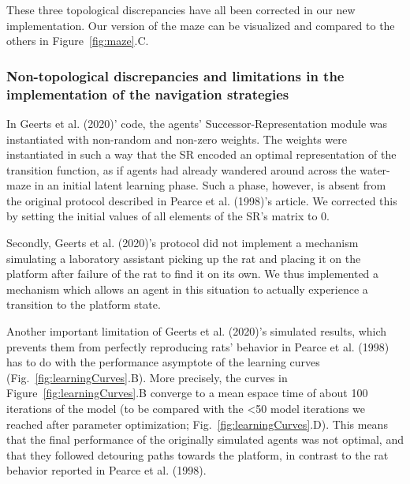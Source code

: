 These three topological discrepancies have all been corrected in our new implementation. Our version of the maze can be visualized and compared to the others in Figure~\ref{fig:maze}.C.

\subsubsection{Non-topological discrepancies and limitations in the implementation of the navigation strategies}

In Geerts et al. (2020)’ code, the agents’ Successor-Representation module was instantiated with non-random and non-zero weights. The weights were instantiated in such a way that the SR encoded an optimal representation of the transition function, as if agents had already wandered around across the water-maze in an initial latent learning phase. Such a phase, however, is absent from the original protocol described in Pearce et al. (1998)'s article. We corrected this by setting the initial values of all elements of the SR's matrix to 0.

Secondly, Geerts et al. (2020)’s protocol did not implement a mechanism simulating a laboratory assistant picking up the rat and placing it on the platform after failure of the rat to find it on its own. We thus implemented a mechanism which allows an agent in this situation to actually experience a transition to the platform state.

Another important limitation of Geerts et al. (2020)'s simulated results, which prevents them from perfectly reproducing rats' behavior in Pearce et al. (1998) has to do with the performance asymptote of the learning curves (Fig.~\ref{fig:learningCurves}.B). More precisely, the curves in Figure~\ref{fig:learningCurves}.B converge to a mean espace time of about 100 iterations of the model (to be compared with the <50 model iterations we reached after parameter optimization; Fig.~\ref{fig:learningCurves}.D). This means that the final performance of the originally simulated agents was not optimal, and that they followed detouring paths towards the platform, in contrast to the rat behavior reported in Pearce et al. (1998).


